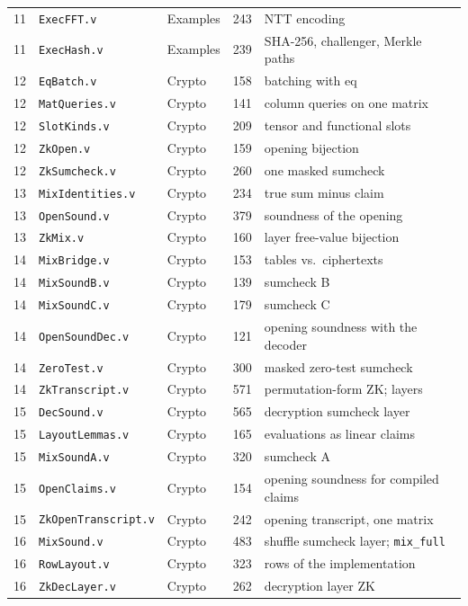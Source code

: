 \documentclass[11pt,a4paper]{article}
\theoremstyle{definition}
\theoremstyle{plain}
\begin{document}
{\begin{longtable}{@{}rlp{}rp{}@{}}
11 & \texttt{ExecFFT.v} & Examples & 243 & NTT encoding\\
11 & \texttt{ExecHash.v} & Examples & 239 & SHA-256, challenger, Merkle paths\\
12 & \texttt{EqBatch.v} & Crypto & 158 & batching with eq\\
12 & \texttt{MatQueries.v} & Crypto & 141 & column queries on one matrix\\
12 & \texttt{SlotKinds.v} & Crypto & 209 & tensor and functional slots\\
12 & \texttt{ZkOpen.v} & Crypto & 159 & opening bijection\\
12 & \texttt{ZkSumcheck.v} & Crypto & 260 & one masked sumcheck\\
13 & \texttt{MixIdentities.v} & Crypto & 234 & true sum minus claim\\
13 & \texttt{OpenSound.v} & Crypto & 379 & soundness of the opening\\
13 & \texttt{ZkMix.v} & Crypto & 160 & layer free-value bijection\\
14 & \texttt{MixBridge.v} & Crypto & 153 & tables vs.\ ciphertexts\\
14 & \texttt{MixSoundB.v} & Crypto & 139 & sumcheck B\\
14 & \texttt{MixSoundC.v} & Crypto & 179 & sumcheck C\\
14 & \texttt{OpenSoundDec.v} & Crypto & 121 & opening soundness with the decoder\\
14 & \texttt{ZeroTest.v} & Crypto & 300 & masked zero-test sumcheck\\
14 & \texttt{ZkTranscript.v} & Crypto & 571 & permutation-form ZK; layers\\
15 & \texttt{DecSound.v} & Crypto & 565 & decryption sumcheck layer\\
15 & \texttt{LayoutLemmas.v} & Crypto & 165 & evaluations as linear claims\\
15 & \texttt{MixSoundA.v} & Crypto & 320 & sumcheck A\\
15 & \texttt{OpenClaims.v} & Crypto & 154 & opening soundness for compiled claims\\
15 & \texttt{ZkOpenTranscript.v} & Crypto & 242 & opening transcript, one matrix\\
16 & \texttt{MixSound.v} & Crypto & 483 & shuffle sumcheck layer; \texttt{mix\_full}\\
16 & \texttt{RowLayout.v} & Crypto & 323 & rows of the implementation\\
16 & \texttt{ZkDecLayer.v} & Crypto & 262 & decryption layer ZK\\

\end{longtable}}
\end{document}
